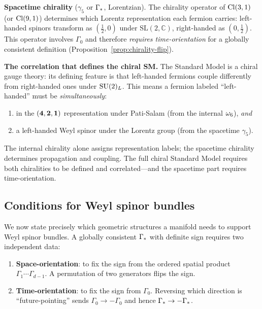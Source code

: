 \medskip\noindent
\textbf{Spacetime chirality} ($\gamma_5$ or $\Gamma_*$, Lorentzian).
The chirality operator of $\mathrm{Cl}(3,1)$ (or $\mathrm{Cl}(9,1)$) determines
which Lorentz representation each fermion carries: left-handed
spinors transform as $(\tfrac{1}{2},0)$ under
$\mathrm{SL}(2,\mathbb{C})$, right-handed as $(0,\tfrac{1}{2})$.
This operator involves $\Gamma_0$ and therefore \emph{requires
time-orientation} for a globally consistent definition
(Proposition~\ref{prop:chirality-flip}).

\medskip\noindent
\textbf{The correlation that defines the chiral SM.}
The Standard Model is a chiral gauge theory: its defining feature is
that left-handed fermions couple differently from right-handed ones
under $\mathrm{SU}(2)_L$.  This means a fermion labeled ``left-handed''
must be \emph{simultaneously}:
\begin{enumerate}
  \item in the $(\mathbf{4},\mathbf{2},\mathbf{1})$ representation under
    Pati-Salam (from the internal $\omega_6$), \emph{and}
  \item a left-handed Weyl spinor under the Lorentz group
    (from the spacetime $\gamma_5$).
\end{enumerate}
The internal chirality alone assigns representation labels;
the spacetime chirality determines propagation and coupling.
The full chiral Standard Model requires both chiralities to be
defined and correlated---and the spacetime part requires
time-orientation.

\subsection{Conditions for Weyl spinor bundles}
\label{sec:weyl-conditions}

We now state precisely which geometric structures a manifold needs
to support Weyl spinor bundles.  A globally consistent
$\Gamma_*$ with definite sign requires two independent data:

\begin{enumerate}
  \item \textbf{Space-orientation}: to fix the sign from the ordered
    spatial product $\Gamma_1\cdots\Gamma_{d-1}$.  A permutation of
    two generators flips the sign.

  \item \textbf{Time-orientation}: to fix the sign from $\Gamma_0$.
    Reversing which direction is ``future-pointing'' sends
    $\Gamma_0\to -\Gamma_0$ and hence $\Gamma_*\to -\Gamma_*$.
\end{enumerate}

